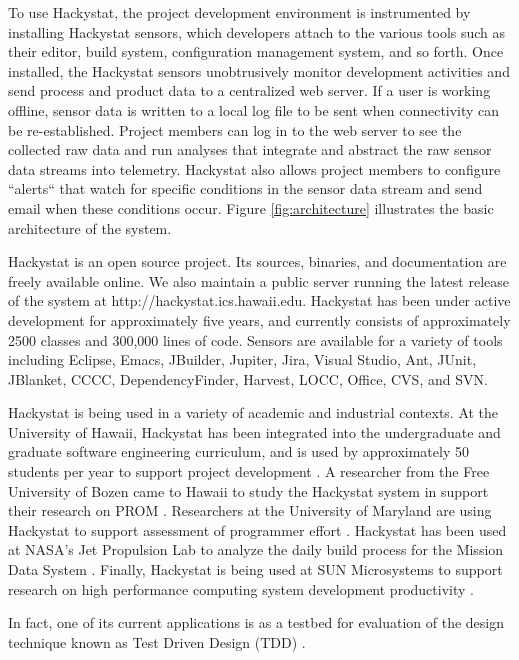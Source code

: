 To use Hackystat, the project development environment is instrumented by
installing Hackystat sensors, which developers attach to the various tools
such as their editor, build system, configuration management system, and so
forth. Once installed, the Hackystat sensors unobtrusively monitor
development activities and send process and product data to a centralized
web server.  If a user is working offline, sensor data is written to a
local log file to be sent when connectivity can be re-established.  Project
members can log in to the web server to see the collected raw data and run
analyses that integrate and abstract the raw sensor data streams into
telemetry.  Hackystat also allows project members to configure ``alerts``
that watch for specific conditions in the sensor data stream and send email
when these conditions occur. Figure \ref{fig:architecture} illustrates the
basic architecture of the system.

Hackystat is an open source project. Its sources, binaries, and
documentation are freely available online.  We also maintain a public
server running the latest release of the system at
http://hackystat.ics.hawaii.edu.  Hackystat has been under active
development for approximately five years, and currently consists of
approximately 2500 classes and 300,000 lines of code.  Sensors are available
for a variety of tools including Eclipse, Emacs, JBuilder, Jupiter, Jira,
Visual Studio, Ant, JUnit, JBlanket, CCCC, DependencyFinder, Harvest, LOCC,
Office, CVS, and SVN.

Hackystat is being used in a variety of academic and industrial contexts.
At the University of Hawaii, Hackystat has been  integrated into the
undergraduate and graduate software engineering curriculum, and is
used by approximately 50 students per year to support project
development \cite{csdl2-03-12}.  A researcher from the Free University of
Bozen came to Hawaii to study the Hackystat system in support their research on
PROM \cite{Sillitti03}.  Researchers at the University of Maryland are
using Hackystat to support assessment of programmer effort
\cite{Hochstein05}.  Hackystat has been used at NASA's Jet Propulsion
Lab to analyze the daily build process for the Mission Data System
\cite{csdl2-03-07}.  Finally, Hackystat is being used at SUN Microsystems
to support research on high performance computing system development
productivity \cite{csdl2-04-03}.

In fact, one of
its current applications is as a testbed for evaluation of the design
technique known as Test Driven Design (TDD) \cite{csdl2-06-02}.

